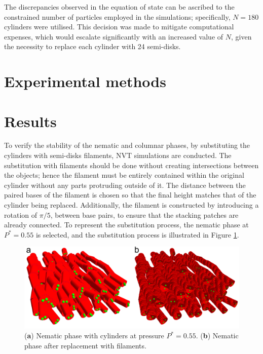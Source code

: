 \documentclass[aip,jcp, amsmath, amssymb, reprint]{revtex4-1}
\begin{document}
The discrepancies observed in the equation of state can be ascribed to the constrained number of particles employed in the simulations; specifically, $N=180$ cylinders were utilised. This decision was made to mitigate computational expenses, which would escalate significantly with an increased value of $N$, given the necessity to replace each cylinder with 24 semi-disks.

\section{\label{exp}Experimental methods}




\section{\label{Results}Results}
To verify the stability of the nematic and columnar phases, by substituting the cylinders with semi-disks filaments, NVT
simulations are conducted. The substitution with filaments should be done without creating intersections between the
objects; hence the filament must be entirely contained within the original cylinder without any parts protruding outside
of it. The distance between the paired bases of the filament is chosen so that the final height matches that of the
cylinder being replaced. Additionally, the filament is constructed by introducing a rotation of $\pi/5$, between base
pairs, to ensure that the stacking patches are already connected. To represent the substitution process, the nematic
phase at $P^*=0.55$ is selected, and the substitution process is illustrated in Figure \ref{sosti1}.

\begin{figure}[h!]
\includegraphics[width=0.9\linewidth]{sosti1.png} 
\caption{\label{sosti1} (\textbf{a}) Nematic phase with cylinders at pressure $P^*=0.55$. (\textbf{b}) Nematic phase after replacement with filaments. } 
\end{figure} 
\end{document}
